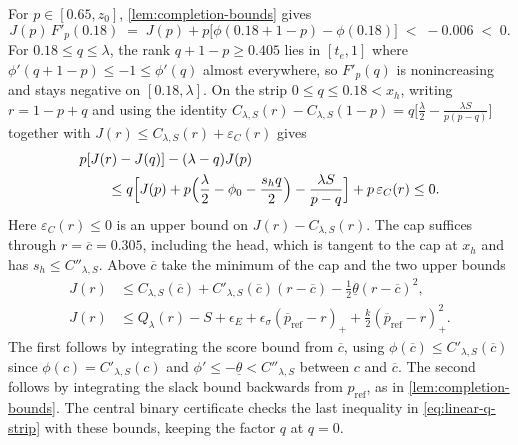 \documentclass[11pt]{article}
\numberwithin{equation}{section}
\theoremstyle{plain}
\theoremstyle{definition}
\newcommand{\1}{\mathbf{1}}
\begin{document}
For $p \in [0.65, z_0]$, \cref{lem:completion-bounds} gives
\[
  J(p)\,F'_p(0.18) \;=\; J(p) + p\bigl[\phi(0.18 + 1 - p) - \phi(0.18)\bigr] \;<\; -0.006 \;<\; 0.
\]
For $0.18 \le q \le \lambda$, the rank $q + 1 - p \ge 0.405$ lies in $[t_e, 1]$ where $\phi'(q + 1 - p) \le -1 \le \phi'(q)$ almost everywhere, so $F'_p(q)$ is nonincreasing and stays negative on $[0.18, \lambda]$. On the strip $0 \le q \le 0.18 < x_h$, writing $r = 1 - p + q$ and using the identity $C_{\lambda, S}(r) - C_{\lambda, S}(1 - p) = q\bigl[\frac{\lambda}{2} - \frac{\lambda S}{p(p - q)}\bigr]$ together with $J(r)\le C_{\lambda,S}(r)+\varepsilon_C(r)$ gives
\begin{equation}
\begin{aligned}
 &p[J(r)-J(q)]-(\lambda-q)J(p)\\
 &\qquad\le q\Bigl[J(p)+p\Bigl(\frac{\lambda}{2}-\phi_0-\frac{s_h q}{2}\Bigr)
               -\frac{\lambda S}{p-q}\Bigr]+p\,\varepsilon_C(r)\le0 .
\end{aligned}
 \label{eq:linear-q-strip}
\end{equation}
Here $\varepsilon_C(r)\le0$ is an upper bound on $J(r)-C_{\lambda,S}(r)$. The cap suffices through $r=\overline c=0.305$, including the head, which is tangent to the cap at $x_h$ and has $s_h\le C''_{\lambda,S}$. Above $\overline c$ take the minimum of the cap and the two upper bounds
\[
\begin{aligned}
 J(r)&\le C_{\lambda,S}(\overline c)+C'_{\lambda,S}(\overline c)(r-\overline c)
                         -\tfrac12\underline\theta(r-\overline c)^2,\\
 J(r)&\le Q_\lambda(r)-S+\epsilon_E+\epsilon_\sigma(\overline p_{\mathrm{ref}}-r)_+
                         +\tfrac{k}{2}(\overline p_{\mathrm{ref}}-r)_+^2 .
\end{aligned}
\]
The first follows by integrating the score bound from $\overline c$, using $\phi(\overline c)\le C'_{\lambda,S}(\overline c)$ since $\phi(c)=C'_{\lambda,S}(c)$ and $\phi'\le-\underline\theta<C''_{\lambda,S}$ between $c$ and $\overline c$. The second follows by integrating the slack bound backwards from $p_{\mathrm{ref}}$, as in \cref{lem:completion-bounds}. The central binary certificate checks the last inequality in \cref{eq:linear-q-strip} with these bounds, keeping the factor $q$ at $q=0$.
\end{document}

